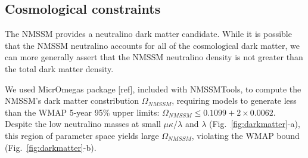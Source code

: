 \documentclass[aps,12pt,superscriptaddress,nofootinbib,floatfix,showpacs]{revtex4}
\begin{document}


\subsection{Cosmological constraints}

The NMSSM provides a neutralino dark matter candidate.  While it is
possible that the NMSSM neutralino accounts for all of the
cosmological dark matter, we can more generally assert that the NMSSM
neutralino density is not greater than the total dark matter density.

We used MicrOmegas package [ref], included with NMSSMTools, to compute
the NMSSM's dark matter constribution $\Omega_{NMSSM}$, requiring
models to generate less than the WMAP 5-year 95\% upper limits:
$\Omega_{NMSSM} \le 0.1099 + 2\times0.0062$.  Despite the low
neutralino masses at small $\mu\kappa/\lambda$ and $\lambda$
(Fig.~\ref{fig:darkmatter}-a), this region of parameter space yields
large $\Omega_{NMSSM}$, violating the WMAP bound
(Fig.~\ref{fig:darkmatter}-b).
\end{document}
